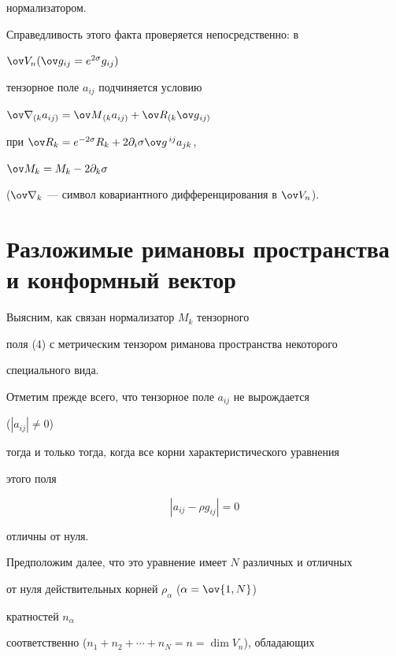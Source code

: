 нормализатором. 


Справедливость этого факта проверяется непосредственно: в 


$\ov V_n(\ov g_{ij}=e^{2\sigma}g_{ij})$ 


тензорное поле $a_{ij}$ подчиняется условию 


$\ov\nabla{}_{(k}a{}_{ij)}=\ov M{}_{(k}a{}_{ij)}+ 


\ov R{}_{(k}\ov g{}_{ij)}$ 


при $\ov R_k=e^{-2\sigma}R_k+2\partial_i\sigma\ov g^{\,ij}a_{jk}$, 


$\ov M_k=M_k-2\partial_k\sigma$ 


($\ov\nabla_k$ --- символ ковариантного дифференцирования в $\ov V_n$). 


 


\section{Разложимые римановы пространства и конформный вектор} 


 


Выясним, как связан нормализатор $M_k$ тензорного 


поля (4) с метрическим тензором риманова пространства некоторого 


специального вида. 


 


Отметим прежде всего, что тензорное поле $a_{ij}$ не вырождается 


($|a_{ij}|\ne0$) 


тогда и только тогда, когда все корни характеристического уравнения 


этого поля 


\begin{equation} 


|a_{ij}-\rho g_{ij}|=0 


\end{equation} 


отличны от нуля. 


 


Предположим далее, что это уравнение имеет $N$ различных и отличных 


от нуля действительных корней $\rho_\alpha$ ($\alpha=\ov{1,N}$) 


кратностей $n_\alpha$ 


соответственно ($n_1+n_2+\dotsb+n_N=n=\dim V_n$), обладающих 


